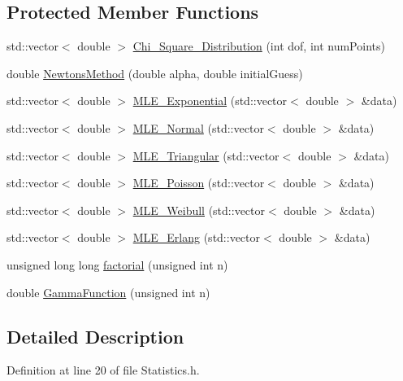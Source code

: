 \subsection*{Protected Member Functions}
\begin{DoxyCompactItemize}
\item 
std\+::vector$<$ double $>$ \hyperlink{class_statistics_object_a2bdaa3f298838c3f83bf17189c832623}{Chi\+\_\+\+Square\+\_\+\+Distribution} (int dof, int num\+Points)
\item 
double \hyperlink{class_statistics_object_ade153b4af992cc1df2c515cde8e01ef9}{Newtons\+Method} (double alpha, double initial\+Guess)
\item 
std\+::vector$<$ double $>$ \hyperlink{class_statistics_object_a39d960b11bc70f9d402b4f2fb8c31296}{M\+L\+E\+\_\+\+Exponential} (std\+::vector$<$ double $>$ \&data)
\item 
std\+::vector$<$ double $>$ \hyperlink{class_statistics_object_ab81aca627b51bbe20e71ac8ded5cf666}{M\+L\+E\+\_\+\+Normal} (std\+::vector$<$ double $>$ \&data)
\item 
std\+::vector$<$ double $>$ \hyperlink{class_statistics_object_aecf3e116092cfcfd2a44e1a1936f7b9d}{M\+L\+E\+\_\+\+Triangular} (std\+::vector$<$ double $>$ \&data)
\item 
std\+::vector$<$ double $>$ \hyperlink{class_statistics_object_af0888138520ad6df0c1c84cd3862c6c2}{M\+L\+E\+\_\+\+Poisson} (std\+::vector$<$ double $>$ \&data)
\item 
std\+::vector$<$ double $>$ \hyperlink{class_statistics_object_ad4af7e6da209156c12ee1a5d2c9071bb}{M\+L\+E\+\_\+\+Weibull} (std\+::vector$<$ double $>$ \&data)
\item 
std\+::vector$<$ double $>$ \hyperlink{class_statistics_object_af9e2fe4fdb940206e96af126d60a75c1}{M\+L\+E\+\_\+\+Erlang} (std\+::vector$<$ double $>$ \&data)
\item 
unsigned long long \hyperlink{class_statistics_object_a033c5346639a0dd44b68838a49bdd926}{factorial} (unsigned int n)
\item 
double \hyperlink{class_statistics_object_a0d9dc9480288e61b3e98134deb18d2d4}{Gamma\+Function} (unsigned int n)
\end{DoxyCompactItemize}


\subsection{Detailed Description}


Definition at line 20 of file Statistics.\+h.




